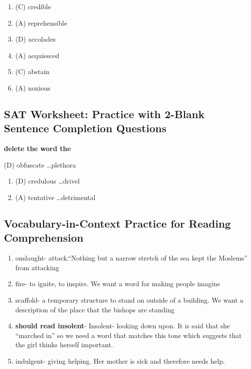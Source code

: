 \begin{enumerate}
\begin{enumerate}

\item (C) credible

\item (A) reprehensible

\item (D) accolades

\item (A) acquiesced

\item (C) abstain

\item (A) noxious

\end{enumerate}

\subsection{SAT Worksheet: Practice with 2-Blank Sentence Completion Questions}

\bigskip
\textbf{delete the word the}

\bigskip
(D) obfuscate \ldots plethora

\begin{enumerate}

\item (D) credulous \ldots drivel

\item (A) tentative \ldots detrimental

\end{enumerate}

\subsection{Vocabulary-in-Context Practice for Reading Comprehension}

\begin{enumerate}

\item onslaught- attack.``Nothing but a narrow stretch of the sea kept the Moslems'' from attacking

\item fire- to ignite, to inspire. We want a word for making people imagine

\item scaffold- a temporary structure to stand on outside of a building. We want a description of the place that the bishops are standing

\item \textbf{should read insolent}- Insolent- looking down upon. It is said that she ``marched in'' so we need a word that matches this tone which suggests that the girl thinks herself important. 

\item indulgent- giving helping. Her mother is sick and therefore needs help.

\end{enumerate}

\vfill

\end{enumerate}